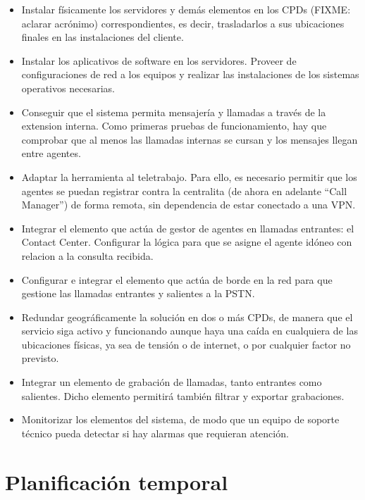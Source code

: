 \documentclass[a4paper, 12pt]{book}
\begin{document}
\begin{itemize}
  \item Instalar físicamente los servidores y demás elementos en los CPDs (FIXME: aclarar acrónimo) correspondientes, es decir, trasladarlos a sus ubicaciones finales en las instalaciones del cliente.
  
  \item Instalar los aplicativos de software en los servidores. Proveer de configuraciones de red a los equipos y realizar las instalaciones de los sistemas operativos necesarias.

  \item Conseguir que el sistema permita mensajería y llamadas a través de la extension interna. Como primeras pruebas de funcionamiento, hay que comprobar que al menos las llamadas internas se cursan y los mensajes llegan entre agentes.
  
  \item Adaptar la herramienta al teletrabajo. Para ello, es necesario permitir que los agentes se puedan registrar contra la centralita (de ahora en adelante ``Call Manager'') de forma remota, sin dependencia de estar conectado a una VPN.   

  \item Integrar el elemento que actúa de gestor de agentes en llamadas entrantes: el Contact Center. Configurar la lógica para que se asigne el agente idóneo con relacion a la consulta recibida.

  \item Configurar e integrar el elemento que actúa de borde en la red para que gestione las llamadas entrantes y salientes a la PSTN.
  
  \item Redundar geográficamente la solución en dos o más CPDs, de manera que el servicio siga activo y funcionando aunque haya una caída en cualquiera de las ubicaciones físicas, ya sea de tensión o de internet, o por cualquier factor no previsto.

  \item Integrar un elemento de grabación de llamadas, tanto entrantes como salientes. Dicho elemento permitirá también filtrar y exportar grabaciones.
  
  \item Monitorizar los elementos del sistema, de modo que un equipo de soporte técnico pueda detectar si hay alarmas que requieran atención.
\end{itemize}

\section{Planificación temporal}
\label{sec:planificacion-temporal}
\end{document}
